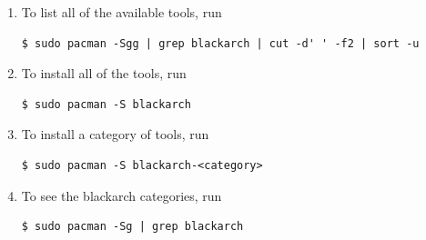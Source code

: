 \documentclass[a4paper, twoside, 11pt]{article}
\begin{document}
\begin{enumerate}
\item To list all of the available tools, run
{\small
\begin{verbatim}
$ sudo pacman -Sgg | grep blackarch | cut -d' ' -f2 | sort -u
\end{verbatim}
}
\item To install all of the tools, run
{\small
\begin{verbatim}
$ sudo pacman -S blackarch
\end{verbatim}
}
\item To install a category of tools, run
{\small
\begin{verbatim}
$ sudo pacman -S blackarch-<category>
\end{verbatim}
}
\item To see the blackarch categories, run
{\small
\begin{verbatim}
$ sudo pacman -Sg | grep blackarch
\end{verbatim}
}
\end{enumerate}
\end{document}
